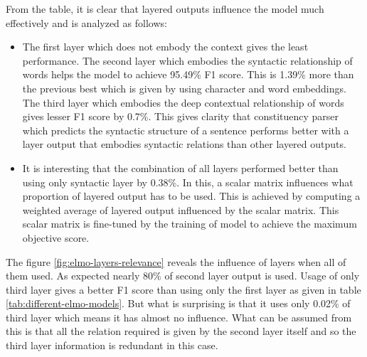 \documentclass[a4paper, 11pt]{article}
\begin{document}
From the table, it is clear that layered outputs influence the model much effectively and is analyzed as follows:
\begin{itemize}
\item The first layer which does not embody the context gives the least performance. The second layer which embodies the syntactic relationship of words helps the model to achieve 95.49\% F1 score. This is 1.39\% more than the previous best which is given by using character and word embeddings. The third layer which embodies the deep contextual relationship of words gives lesser F1 score by 0.7\%. This gives clarity that constituency parser which predicts the syntactic structure of a sentence performs better with a layer output that embodies syntactic relations than other layered outputs. 
\item It is interesting that the combination of all layers performed better than using only syntactic layer by 0.38\%. In this, a scalar matrix influences what proportion of layered output has to be used. This is achieved by computing a weighted average of layered output influenced by the scalar matrix. This scalar matrix is fine-tuned by the training of model to achieve the maximum objective score. 
\end{itemize}

The figure \ref{fig:elmo-layers-relevance} reveals the influence of layers when all of them used. As expected nearly 80\% of second layer output is used. Usage of only third layer gives a better F1 score than using only the first layer as given in table \ref{tab:different-elmo-models}. But what is surprising is that it uses only 0.02\% of third layer which means it has almost no influence. What can be assumed from this is that all the relation required is given by the second layer itself and so the third layer information is redundant in this case. 
\end{document}
